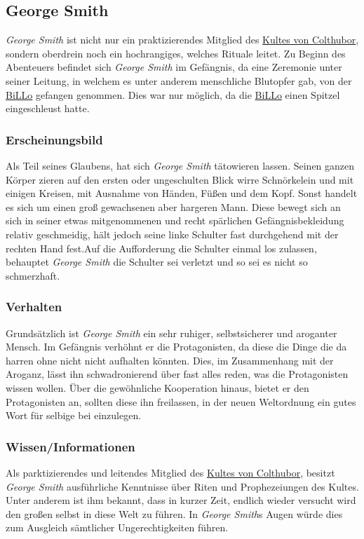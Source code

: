 \subsection{George Smith}
\label{pers:george-smith}
    \emph{George Smith} ist nicht nur ein praktizierendes Mitglied des \hyperref[sons:kult-von-colthubor]{Kultes von Colthubor}, sondern oberdrein noch ein hochrangiges, welches Rituale leitet. Zu Beginn des Abenteuers befindet sich \emph{George Smith} im Gefängnis, da eine Zeremonie unter seiner Leitung, in welchem es unter anderem menschliche Blutopfer gab, von der \hyperref[subsubsec:billo]{BiLLo} gefangen genommen. Dies war nur möglich, da die \hyperref[subsubsec:billo]{BiLLo} einen Spitzel eingeschleust hatte.

    \subsubsection{Erscheinungsbild}
        Als Teil seines Glaubens, hat sich \emph{George Smith} tätowieren lassen. Seinen ganzen Körper zieren auf den ersten oder ungeschulten Blick wirre Schnörkelein und mit einigen Kreisen, mit Ausnahme von Händen, Füßen und dem Kopf. Sonst handelt es sich um einen groß gewachsenen aber hargeren Mann. Diese bewegt sich an sich in seiner etwas mitgenommenen und recht spärlichen Gefängnisbekleidung relativ geschmeidig, hält jedoch seine linke Schulter fast durchgehend mit der rechten Hand fest.Auf die Aufforderung die Schulter einmal los zulassen, behauptet \emph{George Smith} die Schulter sei verletzt und so sei es nicht so schmerzhaft.

    \subsubsection{Verhalten}
        Grundsätzlich ist \emph{George Smith} ein sehr ruhiger, selbstsicherer und aroganter Mensch. Im Gefängnis verhöhnt er die Protagonisten, da diese die Dinge die da harren ohne nicht nicht aufhalten könnten. Dies, im Zusammenhang mit der Aroganz, lässt ihn schwadronierend über fast alles reden, was die Protagonisten wissen wollen. Über die gewöhnliche Kooperation hinaus, bietet er den Protagonisten an, sollten diese ihn freilassen, in der neuen Weltordnung ein gutes Wort für selbige bei  einzulegen.

    \subsubsection{Wissen/Informationen}
        Als parktizierendes und leitendes Mitglied des \hyperref[sons:kult-von-colthubor]{Kultes von Colthubor}, besitzt \emph{George Smith} ausführliche Kenntnisse über Riten und Prophezeiungen des Kultes. Unter anderem ist ihm bekannt, dass in kurzer Zeit, endlich wieder versucht wird den großen  selbst in diese Welt zu führen. In \emph{George Smith}s Augen würde dies zum Ausgleich sämtlicher Ungerechtigkeiten führen.

